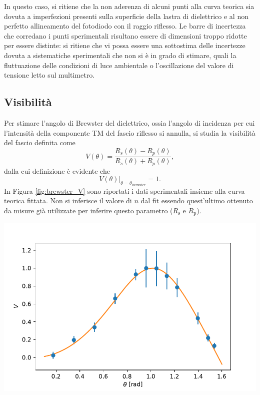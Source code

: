 \documentclass[10pt,oneside,a4paper]{article}
\newenvironment{Figure}
  {\par\medskip\noindent\minipage{\linewidth}}
  {\endminipage\par\medskip}
\begin{document}
\begin{multicols}{2}
In questo caso, si ritiene che la non aderenza di alcuni punti alla curva teorica sia dovuta a imperfezioni presenti sulla superficie della lastra di dielettrico e al non perfetto allineamento del fotodiodo con il raggio riflesso. Le barre di incertezza che corredano i punti sperimentali risultano essere di dimensioni troppo ridotte per essere distinte: si ritiene che vi possa essere una sottostima delle incertezze dovuta a sistematiche sperimentali che non si è in grado di stimare, quali la fluttuazione delle condizioni di luce ambientale o l'oscillazione del valore di tensione letto sul multimetro.

\subsection{Visibilità}
Per stimare l'angolo di Brewster del dielettrico, ossia l'angolo di incidenza per cui l'intensità della componente TM del fascio riflesso si annulla, si studia la visibilità del fascio definita come
\begin{equation}\label{eq:visibilità}
	V(\theta) = \frac{R_s(\theta) - R_p(\theta)}{R_s(\theta) + R_p(\theta)},
\end{equation}
dalla cui definizione è evidente che
\begin{equation}
	\left. V(\theta) \right\vert_{\theta = \theta_\mathrm{Brewster}} = 1.
\end{equation}
In Figura \ref{fig:brewster_V} sono riportati i dati sperimentali insieme alla curva teorica fittata. Non si inferisce il valore di $n$ dal fit essendo quest'ultimo ottenuto da misure già utilizzate per inferire questo parametro ($R_\mathrm{s}$ e $R_\mathrm{p}$).
\begin{Figure}
	\begin{center}
	\includegraphics[width=\linewidth]{visibilità.pdf}

\end{center}
\end{Figure}
\end{multicols}
\end{document}
